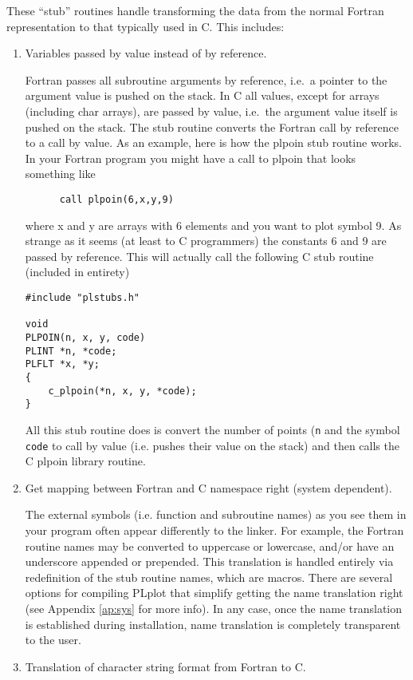 These ``stub'' routines handle transforming the data
from the normal Fortran representation to that typically used in C.  This
includes:
\begin{enumerate}
\item Variables passed by value instead of by reference.

Fortran passes all subroutine arguments by reference, i.e.~a pointer to the
argument value is pushed on the stack.  In C all values, except for arrays
(including char arrays), are passed by value, i.e.~the argument value
itself is pushed on the stack.  The stub routine converts the Fortran call
by reference to a call by value.  As an example, here is how the plpoin stub
routine works.  In your Fortran program you might have a call to plpoin that
looks something like
\begin{verbatim}
      call plpoin(6,x,y,9)
\end{verbatim}

where x and y are arrays with 6 elements and you want to plot symbol 9.
As strange as it seems (at least to C programmers) the constants 6 and
9 are passed by reference.   This will actually call the following C
stub routine (included in entirety)
\begin{verbatim}
#include "plstubs.h"

void 
PLPOIN(n, x, y, code)
PLINT *n, *code;
PLFLT *x, *y;
{
    c_plpoin(*n, x, y, *code);
}
\end{verbatim}
All this stub routine does is convert the number of points ({\tt *n} and the
symbol {\tt *code} to call by value (i.e.  pushes their value on the stack)
and then calls the C plpoin library routine.

\item Get mapping between Fortran and C namespace right (system dependent).

The external symbols (i.e. function and subroutine names) as you see them
in your program often appear differently to the linker.  For example, the
Fortran routine names may be converted to uppercase or lowercase, and/or
have an underscore appended or prepended.  This translation is handled
entirely via redefinition of the stub routine names, which are macros.
There are several options for compiling PLplot that simplify getting the
name translation right (see Appendix \ref{ap:sys} for more info).  In any
case, once the name translation is established during installation, name
translation is completely transparent to the user.

\item Translation of character string format from Fortran to C.


\end{enumerate}
